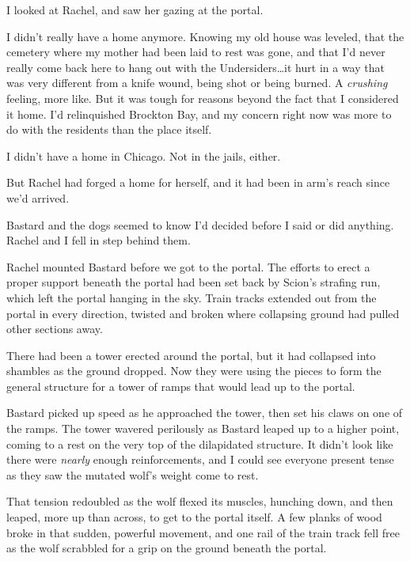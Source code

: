 I looked at Rachel, and saw her gazing at the portal.



I didn't really have a home anymore.  Knowing my old house was leveled, that the cemetery where my mother had been laid to rest was gone, and that I'd never really come back here to hang out with the Undersiders\ldots it hurt in a way that was very different from a knife wound, being shot or being burned.  A \emph{crushing} feeling, more like.  But it was tough for reasons beyond the fact that I considered it home.  I'd relinquished Brockton Bay, and my concern right now was more to do with the residents than the place itself.



I didn't have a home in Chicago.  Not in the jails, either.



But Rachel had forged a home for herself, and it had been in arm's reach since we'd arrived.



Bastard and the dogs seemed to know I'd decided before I said or did anything.  Rachel and I fell in step behind them.



Rachel mounted Bastard before we got to the portal.  The efforts to erect a proper support beneath the portal had been set back by Scion's strafing run, which left the portal hanging in the sky.  Train tracks extended out from the portal in every direction, twisted and broken where collapsing ground had pulled other sections away.



There had been a tower erected around the portal, but it had collapsed into shambles as the ground dropped.  Now they were using the pieces to form the general structure for a tower of ramps that would lead up to the portal.



Bastard picked up speed as he approached the tower, then set his claws on one of the ramps.  The tower wavered perilously as Bastard leaped up to a higher point, coming to a rest on the very top of the dilapidated structure.  It didn't look like there were \emph{nearly} enough reinforcements, and I could see everyone present tense as they saw the mutated wolf's weight come to rest.



That tension redoubled as the wolf flexed its muscles, hunching down, and then leaped, more up than across, to get to the portal itself.  A few planks of wood broke in that sudden, powerful movement, and one rail of the train track fell free as the wolf scrabbled for a grip on the ground beneath the portal.



